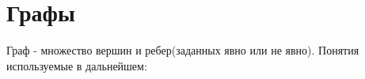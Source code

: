 \chapter{Графы}
Граф - множество вершин и ребер(заданных явно или не явно). Понятия используемые в дальнейшем:
